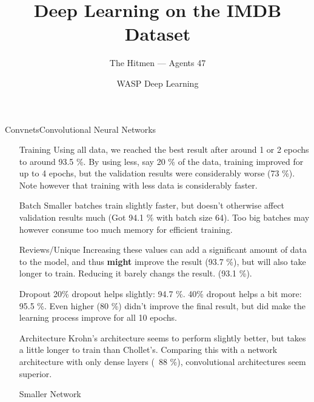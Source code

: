 \documentclass{beamer}
\title{Deep Learning on the IMDB Dataset}
\date{WASP Deep Learning}
\author[Agents 47]{The Hitmen --- Agents 47}
\begin{document}
\begin{frame}
  \titlepage
\end{frame}


\begin{frame}{Convnets}{Convolutional Neural Networks}

  \begin{itemize}

  \item[Training] Using all data, we reached the best result after around 1 or 2
    epochs to around 93.5 \%. By using less, say 20 \% of the data, training
    improved for up to 4 epochs, but the validation results were considerably
    worse (73 \%). Note however that training with less data is considerably
    faster.

  \item[Batch] Smaller batches train slightly faster, but doesn't otherwise
    affect validation results much (Got 94.1 \% with batch size 64). Too big
    batches may however consume too much memory for efficient training.

  \item[Reviews/Unique] Increasing these values can add a significant amount of
    data to the model, and thus \textbf{might} improve the result (93.7 \%), but
    will also take longer to train. Reducing it barely changs the result. (93.1
    \%).

  \item[Dropout] 20\% dropout helps slightly: 94.7 \%.  40\% dropout helps a bit
    more: 95.5 \%. Even higher (80 \%) didn't improve the final result, but did
    make the learning process improve for all 10 epochs.

  \item[Architecture] Krohn's architecture seems to perform slightly better, but
    takes a little longer to train than Chollet's. Comparing this with a network
    architecture with only dense layers (~88 \%), convolutional architectures seem
    superior.

  \item[Smaller Network]

  \end{itemize}

\end{frame}
\end{document}
